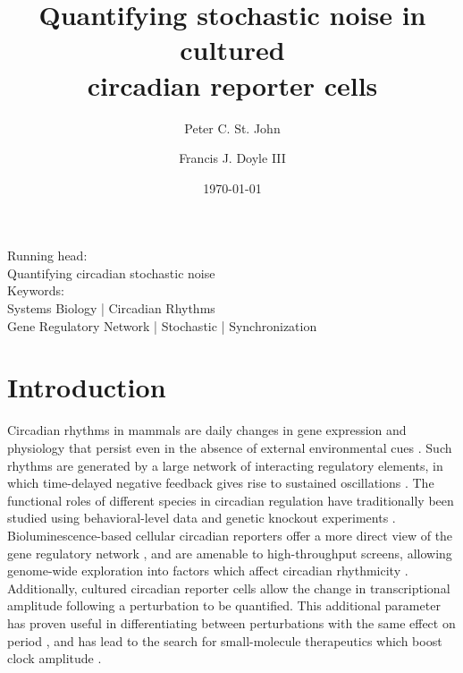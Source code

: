 \documentclass[11pt, letterpaper]{article}
\begin{document}
\title{Quantifying stochastic noise in cultured\\ circadian reporter cells}
\author[1]{Peter C. St. John}
\author[1,*]{Francis J. Doyle III}
\date{\today}
\maketitle

\begin{center}
Running head:\\ {Quantifying circadian stochastic noise} \\[1ex]
Keywords:\\ Systems Biology | Circadian Rhythms \\ Gene
Regulatory Network | Stochastic | Synchronization
\end{center}

\pagebreak
\begin{abstract}

\end{abstract}

\section*{Introduction}

Circadian rhythms in mammals are daily changes in gene expression and physiology that persist even in the absence of external environmental cues \cite{Herzog2007}.
Such rhythms are generated by a large network of interacting regulatory elements, in which time-delayed negative feedback gives rise to sustained oscillations \cite{Ueda2005}.
The functional roles of different species in circadian regulation have traditionally been studied using behavioral-level data and genetic knockout experiments \cite{Vitaterna1994}.
Bioluminescence-based cellular circadian reporters offer a more direct view of the gene regulatory network \cite{Balsalobre1998}, and are amenable to high-throughput screens, allowing genome-wide exploration into factors which affect circadian rhythmicity \cite{Zhang2009}.
Additionally, cultured circadian reporter cells allow the change in transcriptional amplitude following a perturbation to be quantified.
This additional parameter has proven useful in differentiating between perturbations with the same effect on period \cite{St.John2014}, and has lead to the search for small-molecule therapeutics which boost clock amplitude \cite{Chen2013}.
\end{document}
